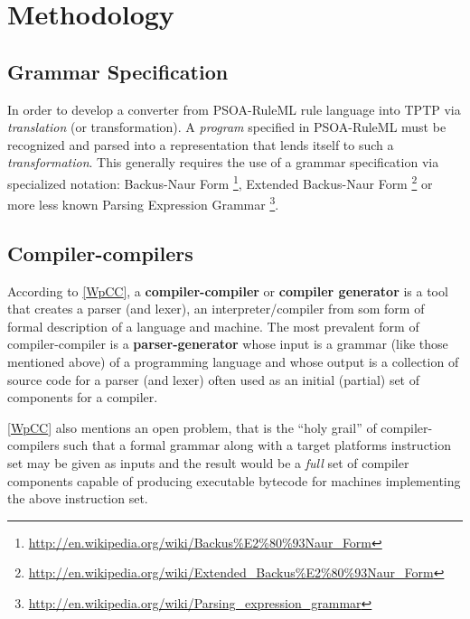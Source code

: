\documentclass[letterpaper,10pt,english]{sphinxmanual}
\begin{document}
\section{Methodology}
\label{project-proposal/index:methodology}\label{project-proposal/index:index-0}

\subsection{Grammar Specification}
\label{project-proposal/index:grammar-specification}
In order to develop a converter from PSOA-RuleML rule language into TPTP via
\emph{translation} (or transformation).  A \emph{program} specified in PSOA-RuleML must be
recognized and parsed into a representation that lends itself to such a
\emph{transformation}.  This generally requires the use of a grammar specification
via specialized notation: Backus-Naur Form \footnote{
\href{http://en.wikipedia.org/wiki/Backus\%E2\%80\%93Naur\_Form}{http://en.wikipedia.org/wiki/Backus\%E2\%80\%93Naur\_Form}
}, Extended Backus-Naur Form \footnote{
\href{http://en.wikipedia.org/wiki/Extended\_Backus\%E2\%80\%93Naur\_Form}{http://en.wikipedia.org/wiki/Extended\_Backus\%E2\%80\%93Naur\_Form}
} or
more less known Parsing Expression Grammar \footnote{
\href{http://en.wikipedia.org/wiki/Parsing\_expression\_grammar}{http://en.wikipedia.org/wiki/Parsing\_expression\_grammar}
}.


\subsection{Compiler-compilers}
\label{project-proposal/index:compiler-compilers}
According to {\hyperref[project-proposal/index:wpcc]{{[}WpCC{]}}}, a \textbf{compiler-compiler} or \textbf{compiler generator} is a
tool that creates a parser (and lexer), an interpreter/compiler from som form of
formal description of a language and machine.  The most prevalent form of
compiler-compiler is a \textbf{parser-generator} whose input is a grammar (like those
mentioned above) of a programming language and whose output is a collection of
source code for a parser (and lexer) often used as an initial (partial) set of components
for a compiler.

{\hyperref[project-proposal/index:wpcc]{{[}WpCC{]}}} also mentions an open problem, that is the ``holy grail'' of
compiler-compilers such that a formal grammar along with a target platforms
instruction set may be given as inputs and the result would be a \emph{full} set of
compiler components capable of producing executable bytecode for machines
implementing the above instruction set.
\end{document}
